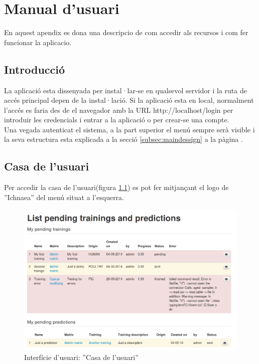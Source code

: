 \chapter{Manual d'usuari}
\label{cha:userguide}
En aquest apendix es dona una descripcio de com accedir als recursos i com fer funcionar la aplicacio.

\section{Introducció}
La aplicació esta dissenyada per instal·lar-se en qualsevol servidor i la ruta de accés principal depen de la instal·lació.
Si la aplicació esta en local, normalment l'accés es faria des de el navegador amb la URL http://localhost/login per introduir les credencials i entrar a la aplicació o per crear-se una compte.\\

Una vegada autenticat el sistema, a la part superior el menú sempre serà visible i la seva estructura esta explicada a la secció \ref{subsec:maindessign} a la p\`{a}gina \pageref{menudessign}.

\section{Casa de l'usuari}
\label{sec:home}
Per accedir la casa de l'usuari(figura \ref{fig:dashboard}) es pot fer mitjançant el logo de ''Ichnaea'' del menú situat a l'esquerra.\\

\begin{figure}[h!]
  \centering
  \includegraphics[scale=0.4]{img/userguide/dashboard.png}
  \caption{Interfície d'usuari: ''Casa de l'usuari''}
  \label{fig:dashboard}
\end{figure}


